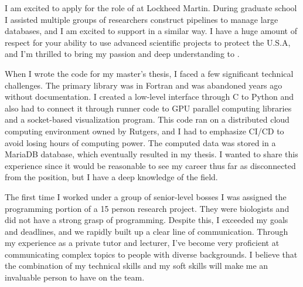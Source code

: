 
I am excited to apply for the role of \myPosition{} at Lockheed Martin.
During graduate school I assisted multiple groups of researchers construct pipelines to manage large databases, and I am excited to support \myEmployer{} in a similar way.
I have a huge amount of respect for your ability to use advanced scientific projects to protect the U.S.A, and I'm thrilled to bring my passion and deep understanding to \myEmployer{}.


When I wrote the code for my master's thesis, I faced a few significant technical challenges.
The primary library was in Fortran and was abandoned years ago without documentation.
I created a low-level interface through C to Python and also had to connect it through runner code to GPU parallel computing libraries and a socket-based visualization program.
This code ran on a distributed cloud computing environment owned by Rutgers, and I had to emphasize CI/CD to avoid losing hours of computing power.
The computed data was stored in a MariaDB database, which eventually resulted in my thesis.
I wanted to share this experience since it would be reasonable to see my career thus far as disconnected from the position, but I have a deep knowledge of the field.


The first time I worked under a group of senior-level bosses I was assigned the programming portion of a 15 person research project.
They were biologists and did not have a strong grasp of programming.
Despite this, I exceeded my goals and deadlines, and we rapidly built up a clear line of communication.
Through my experience as a private tutor and lecturer, I've become very proficient at communicating complex topics to people with diverse backgrounds.
I believe that the combination of my technical skills and my soft skills will make me an invaluable person to have on the team.
